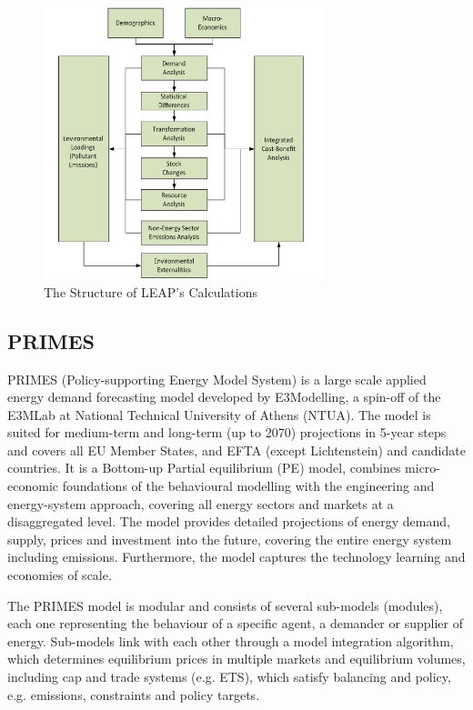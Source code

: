 \documentclass[lettersize,journal]{IEEEtran}
\begin{document}
  \begin{figure}[!t]
  \centering
  \includegraphics[width=3.2in]{leapstructure.png}
  \caption{The Structure of LEAP's Calculations}
  \label{fig2}
  \end{figure}

  \subsection{PRIMES}
  PRIMES (Policy-supporting Energy Model System) is a large scale applied energy demand forecasting model developed by E3Modelling, a spin-off of the E3MLab at National Technical University of Athens (NTUA). The model is suited for medium-term and long-term (up to 2070) projections in 5-year steps and covers all EU Member States, and EFTA (except Lichtenstein) and candidate countries. It is a Bottom-up Partial equilibrium (PE) model, combines micro-economic foundations of the behavioural modelling with the engineering and energy-system approach, covering all energy sectors and markets at a disaggregated level. The model provides detailed projections of energy demand, supply, prices and investment into the future, covering the entire energy system including emissions. Furthermore, the model captures the technology learning and economies of scale.

  
  The PRIMES model is modular and consists of several sub-models (modules), each one representing the behaviour of a specific agent, a demander or supplier of energy. Sub-models link with each other through a model integration algorithm, which determines equilibrium prices in multiple markets and equilibrium volumes, including cap and trade systems (e.g. ETS), which satisfy balancing and policy, e.g. emissions, constraints and policy targets.
\end{document}
